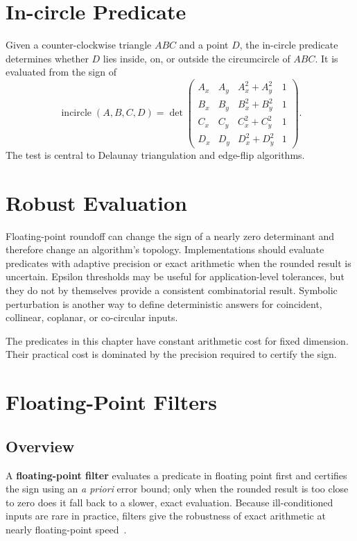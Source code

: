 \section{In-circle Predicate}
\label{sec:incircle_predicate}

Given a counter-clockwise triangle $ABC$ and a point $D$, the in-circle
predicate determines whether $D$ lies inside, on, or outside the circumcircle
of $ABC$. It is evaluated from the sign of
\[
  \operatorname{incircle}(A,B,C,D) =
  \det\begin{pmatrix}
    A_x & A_y & A_x^2+A_y^2 & 1\\
    B_x & B_y & B_x^2+B_y^2 & 1\\
    C_x & C_y & C_x^2+C_y^2 & 1\\
    D_x & D_y & D_x^2+D_y^2 & 1
  \end{pmatrix}.
\]
The test is central to Delaunay triangulation and edge-flip algorithms.

\section{Robust Evaluation}
\label{sec:robust_predicates}

Floating-point roundoff can change the sign of a nearly zero determinant and
therefore change an algorithm's topology. Implementations should evaluate
predicates with adaptive precision or exact arithmetic when the rounded
result is uncertain. Epsilon thresholds may be useful for application-level
 tolerances, but they do not by themselves provide a consistent combinatorial
result. Symbolic perturbation is another way to define deterministic answers
for coincident, collinear, coplanar, or co-circular inputs.

The predicates in this chapter have constant arithmetic cost for fixed
dimension. Their practical cost is dominated by the precision required to
certify the sign.

\section{Floating-Point Filters}
\label{sec:floating_point_filters}

\subsection{Overview}
A \textbf{floating-point filter} evaluates a
predicate in floating point first and certifies the sign using an \emph{a
priori} error bound; only when the rounded result is too close to zero does
it fall back to a slower, exact evaluation. Because ill-conditioned inputs
are rare in practice, filters give the robustness of exact arithmetic at
nearly floating-point speed~\cite{shewchuk1997}.

